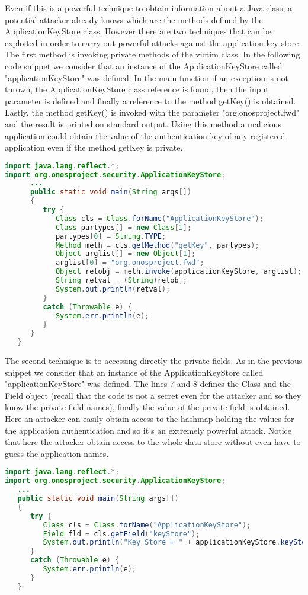 Even if this is a powerful technique to obtain information about a Java class, a potential attacker already knows which are the methods defined by the ApplicationKeyStore class. However there are two techniques that can be exploited in order to carry out powerful attacks against the application key store. The first method is invoking private methods of the victim class. In the following code snippet we consider that an instance of the ApplicationKeyStore called "applicationKeyStore" was defined. In the main function if an exception is not thrown, the ApplicationKeyStore class reference is found, then the input parameter is defined and finally a reference to the method getKey() is obtained. Lastly, the method getKey() is invoked with the parameter "org.onosproject.fwd" and the result is printed on standard output. Using this method a malicious application could obtain the value of the authentication key of any registered application even if the method getKey is private.
\begin{lstlisting}[language=Java]
import java.lang.reflect.*;
import org.onosproject.security.ApplicationKeyStore;
      ...
      public static void main(String args[])
      {
         try {
            Class cls = Class.forName("ApplicationKeyStore");
            Class partypes[] = new Class[1];
            partypes[0] = String.TYPE;
            Method meth = cls.getMethod("getKey", partypes);
            Object arglist[] = new Object[1];
            arglist[0] = "org.onosproject.fwd";
            Object retobj = meth.invoke(applicationKeyStore, arglist);
            String retval = (String)retobj;
            System.out.println(retval);
         }
         catch (Throwable e) {
            System.err.println(e);
         }
      }
   }
\end{lstlisting}

The second technique is to accessing directly the private fields. As in the previous snippet we consider that an instance of the ApplicationKeyStore called "applicationKeyStore" was defined. The lines 7 and 8 defines the Class and the Field object (recall that the code is not a secret even for the attacker and so they know the private field names), finally the value of the private field is obtained. Here an attacker can easily obtain access to the hashmap holding the values for the application authentication and so it's an extremely powerful attack. Notice that here the attacker obtain access to the whole data store without even have to guess the application names.
\begin{lstlisting}[language=Java]
import java.lang.reflect.*;
import org.onosproject.security.ApplicationKeyStore;
   ...
   public static void main(String args[])
   {
      try {
         Class cls = Class.forName("ApplicationKeyStore");
         Field fld = cls.getField("keyStore");
         System.out.println("Key Store = " + applicationKeyStore.keyStore);
      } 
      catch (Throwable e) {
         System.err.println(e);
      }
   }
\end{lstlisting}

